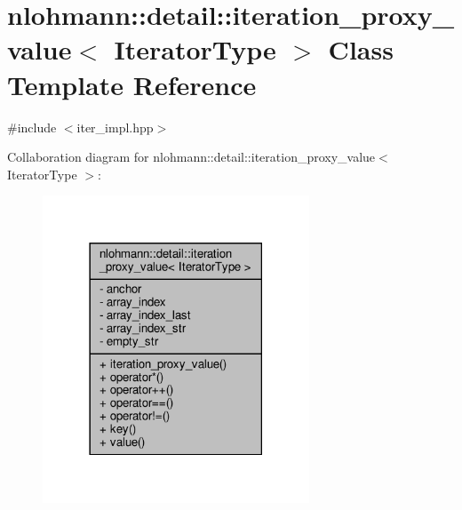 \hypertarget{classnlohmann_1_1detail_1_1iteration__proxy__value}{}\section{nlohmann\+:\+:detail\+:\+:iteration\+\_\+proxy\+\_\+value$<$ Iterator\+Type $>$ Class Template Reference}
\label{classnlohmann_1_1detail_1_1iteration__proxy__value}


{\ttfamily \#include $<$iter\+\_\+impl.\+hpp$>$}



Collaboration diagram for nlohmann\+:\+:detail\+:\+:iteration\+\_\+proxy\+\_\+value$<$ Iterator\+Type $>$\+:
\nopagebreak
\begin{figure}[H]
\begin{center}
\leavevmode
\includegraphics[width=225pt]{classnlohmann_1_1detail_1_1iteration__proxy__value__coll__graph}
\end{center}
\end{figure}
